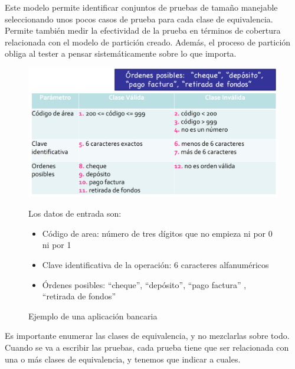 Este modelo permite identificar conjuntos de pruebas de tamaño manejable seleccionando unos pocos casos de prueba para cada clase de equivalencia.
Permite también medir la efectividad de la prueba en términos de cobertura relacionada con el modelo de partición creado.
Además, el proceso de partición obliga al tester a pensar sistemáticamente sobre lo que importa.


\begin{figure}[htbp]
   \centering
   \includegraphics[width=0.65\columnwidth]{images/05/claseBanca.png}
   \caption{Ejemplo de una aplicación bancaria}
   {Los datos de entrada son:\ns
   \begin{itemize}
   	\item Código de area: número de tres dígitos que no empieza ni por 0 ni por 1
	\item Clave identificativa de la operación: 6 caracteres alfanuméricos
	\item Órdenes posibles: ``cheque'', ``depósito'', ``pago factura'' , ``retirada de fondos'' 
   \end{itemize}}
   \label{fig:05/claseBanca}
\end{figure}

Es importante enumerar las clases de equivalencia, y no mezclarlas sobre todo.
Cuando se va a escribir las pruebas, cada prueba tiene que ser relacionada con una o más clases de equivalencia, y tenemos que indicar a cuales.

